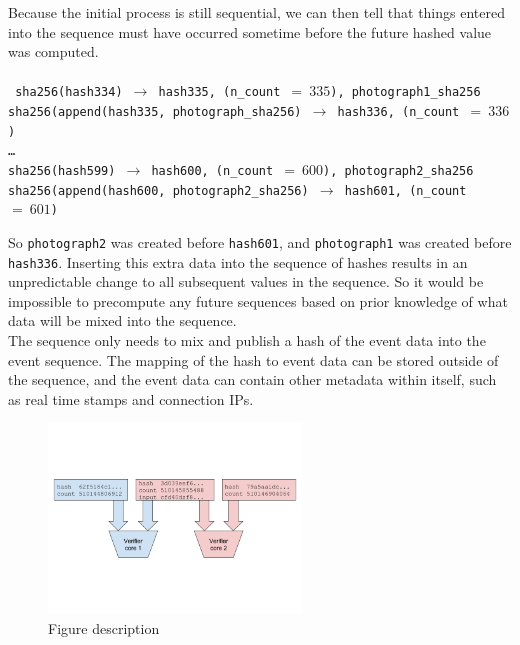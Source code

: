 \documentclass[12pt]{article}
\begin{document}
Because the initial process is still sequential, we can then tell that things entered into the sequence must have occurred sometime before the future hashed value was computed.\\\\\noindent
\texttt{
sha256(hash334) $\rightarrow$ hash335, (n\_count $=~335$), photograph1\_sha256\\
sha256(append(hash335, photograph\_sha256) $\rightarrow$ hash336,
(n\_count $=~336$)\\
\ldots\\
sha256(hash599) $\rightarrow$ hash600, (n\_count $=~600$), photograph2\_sha256
sha256(append(hash600, photograph2\_sha256) $\rightarrow$ hash601,
(n\_count $=~601$)\\
}

So \texttt{photograph2} was created before \texttt{hash601}, and
\texttt{photograph1} was created before \texttt{hash336}. Inserting this extra data into the sequence of hashes results in an unpredictable change to all subsequent values in the sequence. So it would be impossible to precompute any future sequences based on prior knowledge of what data will be mixed into the sequence.\\

The sequence only needs to mix and publish a hash of the event data into the event sequence. The mapping of the hash to event data can be stored outside of the sequence, and the event data can contain other metadata within itself, such as real time stamps and connection IPs.\\

\begin{figure}
  \begin{center}
    \centering
    \includegraphics[width=0.6\textwidth]{figures/fig_3.png}
    \caption[Fig 3]{Figure description \label{fig:poh_insert}}
  \end{center}
  \end{figure}
\end{document}
